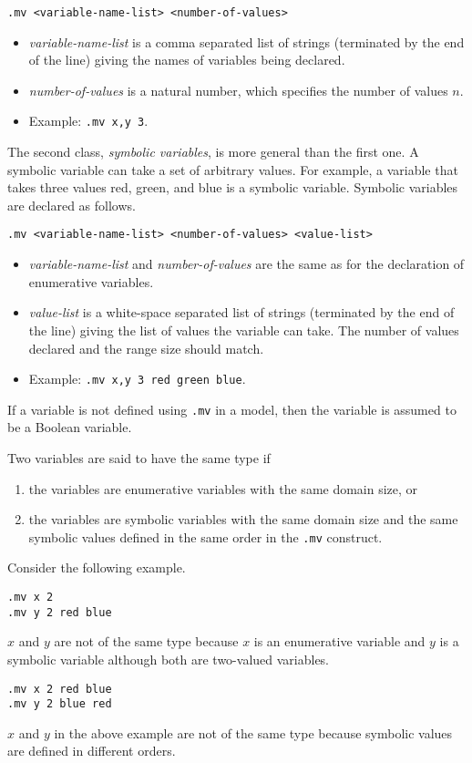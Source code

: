 \begin{verbatim}
.mv <variable-name-list> <number-of-values>
\end{verbatim}
\begin{itemize}
\item {\em variable-name-list} is a comma separated list
of strings (terminated by the end of the line)
giving the names of variables being declared.
\item {\em number-of-values} is a natural number, which specifies
the number of values $n$.
\item Example: {\tt .mv x,y 3}.
\end{itemize}

The second class, {\em symbolic variables}, is more general than the first one.
A symbolic variable can take a set of arbitrary values.
For example, a variable that takes three values red, green, and blue
is a symbolic variable.
Symbolic variables are declared as follows.

\begin{verbatim}
.mv <variable-name-list> <number-of-values> <value-list>
\end{verbatim}
\begin{itemize}
\item {\em variable-name-list} and {\em number-of-values}
are the same as for the declaration of enumerative variables.
\item {\em value-list} is a white-space separated list
of strings (terminated by the end of the line)
giving the list of values the variable can take.
The number of values declared and the range size
should match.
\item Example: {\tt .mv x,y 3 red green blue}.
\end{itemize}

If a variable is not defined using {\tt .mv} in a model,
then the variable is assumed to be a Boolean variable.

Two variables are said to have the same type
if
\begin{enumerate}
\item the variables are enumerative variables with the same domain size,
or
\item the variables are symbolic variables with the same domain size
and the same symbolic values defined in the same order in the {\tt .mv}
construct.
\end{enumerate}
Consider the following example.
\begin{verbatim}
.mv x 2
.mv y 2 red blue
\end{verbatim}
$x$ and $y$ are not of the same type because
$x$ is an enumerative variable and $y$ is a symbolic variable
although both are two-valued variables.
\begin{verbatim}
.mv x 2 red blue
.mv y 2 blue red
\end{verbatim}
$x$ and $y$ in the above example are not of the same type
because symbolic values are defined in different orders.

